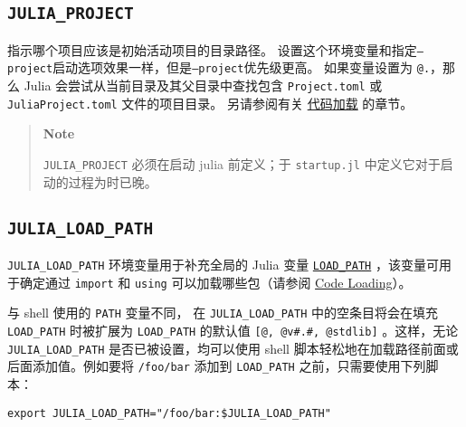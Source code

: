 \hypertarget{4954349069727209817}{}


\subsection{\texttt{JULIA\_PROJECT}}



指示哪个项目应该是初始活动项目的目录路径。 设置这个环境变量和指定\texttt{--project}启动选项效果一样，但是\texttt{--project}优先级更高。 如果变量设置为 \texttt{@.}，那么 Julia 会尝试从当前目录及其父目录中查找包含 \texttt{Project.toml} 或 \texttt{JuliaProject.toml} 文件的项目目录。 另请参阅有关 \hyperlink{11949095373261797528}{代码加载} 的章节。



\begin{quote}
\textbf{Note}

\texttt{JULIA\_PROJECT} 必须在启动 julia 前定义；于 \texttt{startup.jl} 中定义它对于启动的过程为时已晚。

\end{quote}


\hypertarget{1363234541366705734}{}


\subsection{\texttt{JULIA\_LOAD\_PATH}}



\texttt{JULIA\_LOAD\_PATH} 环境变量用于补充全局的 Julia 变量 \hyperlink{17914149694871263675}{\texttt{LOAD\_PATH}} ，该变量可用于确定通过 \texttt{import} 和 \texttt{using} 可以加载哪些包（请参阅 \hyperlink{11949095373261797528}{Code Loading}）。



与 shell 使用的 \texttt{PATH} 变量不同， 在 \texttt{JULIA\_LOAD\_PATH} 中的空条目将会在填充 \texttt{LOAD\_PATH} 时被扩展为 \texttt{LOAD\_PATH} 的默认值 \texttt{[{\textquotedbl}@{\textquotedbl}, {\textquotedbl}@v\#.\#{\textquotedbl}, {\textquotedbl}@stdlib{\textquotedbl}]} 。这样，无论 \texttt{JULIA\_LOAD\_PATH} 是否已被设置，均可以使用 shell 脚本轻松地在加载路径前面或后面添加值。例如要将 \texttt{/foo/bar} 添加到 \texttt{LOAD\_PATH} 之前，只需要使用下列脚本：




\begin{lstlisting}
export JULIA_LOAD_PATH="/foo/bar:$JULIA_LOAD_PATH"
\end{lstlisting}




